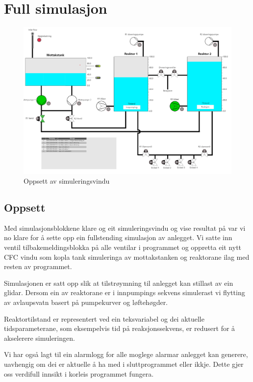 \section{Full simulasjon}
\thispagestyle{fancy}
\begin{figure}[htbp]
    \centering
    \includegraphics[width=1\textwidth]{Bilder/Simuleringsbilde.png}
    \caption{Oppsett av simuleringsvindu}\label{fig:Simulering}
\end{figure}
\subsection{Oppsett}
Med simulasjonsblokkene klare og eit simuleringsvindu og vise resultat på var vi
no klare for å sette opp ein fullstending simulasjon av anlegget.
Vi satte inn ventil tilbakemeldingsblokka på alle ventilar i programmet og oppretta eit
nytt CFC vindu som kopla tank simuleringa av mottakstanken og reaktorane ilag med resten av
programmet.

Simulasjonen er satt opp slik at tilstrøymning til anlegget kan stillast av ein glidar.
Dersom ein av reaktorane er i innpumpings sekvens simulerast vi flytting av avlaupsvatn
basert på pumpekurver og løftehøgder.

Reaktortilstand er representert ved ein teksvariabel og
dei aktuelle tidsparameterane, som eksempelvis tid på reaksjonssekvens,
er redusert for å akselerere simuleringen.

Vi har også lagt til ein alarmlogg for alle moglege alarmar anlegget kan generere, 
uavhengig om dei er aktuelle å ha med i sluttprogrammet eller ikkje.
Dette gjer oss verdifull innsikt i korleis programmet fungera.



